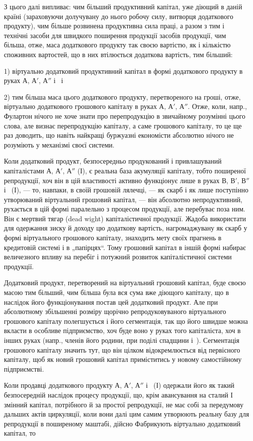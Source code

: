 
З цього далі випливає: чим більший продуктивний капітал, уже
діющий в даній країні (зараховуючи долучувану до нього робочу силу,
витворця додаткового продукту), чим більше розвинена продуктивна сила
праці, а разом з тим і технічні засоби для швидкого поширення продукції
засобів продукції, чим більша, отже, маса додаткового продукту
так своєю вартістю, як і кількістю споживних вартостей, що в них
втілюється додаткова вартість, тим більший:

1) віртуально додатковий продуктивний капітал в формі додаткового
продукту в руках $А$, $А'$, $А''$ і~ і

2) тим більша маса цього додаткового продукту, перетвореного на
гроші, отже, віртуально додаткового грошового капіталу в руках $А$, $А'$, $А''$.
Отже, коли, напр., Фулартон нічого не хоче знати про перепродукцію
в звичайному розумінні цього слова, але визнає перепродукцію капіталу,
а саме грошового капіталу, то це ще раз доводить, що навіть найкращі
буржуазні економісти абсолютно нічого не розуміють у механізмі своєї
системи.

Коли додатковий продукт, безпосередньо продукований і привлашуваний
капіталістами $А$, $А'$, $А''$ (І), є реальна база акумуляції капіталу,
тобто поширеної репродукції, хоч він в цій властивості активно функціонує
лише в руках $В$, $В'$, $В''$ і~ (І), — то, навпаки, в своїй грошовій
лялечці, — як скарб і як лише поступінно утворюваний віртуальний
грошовий капітал, — він абсолютно непродуктивний, рухається
в цій формі паралельно з процесом продукції, але перебуває поза ним.
Він є мертвий тягар (dead wight) капіталістичної продукції. Жадоба використати
для одержання зиску й доходу цю додаткову вартість, нагромаджувану
як скарб у формі віртуального грошового капіталу, знаходить
мету своїх прагнень в кредитовій системі і в „папірцях“. Тому грошовий
капітал в іншій формі набирає величезного впливу на перебіг і потужний
розвиток капіталістичної системи продукції.

Додатковий продукт, перетворений на віртуальний грошовий капітал,
буде своєю масою тим більший, чим більша була вся сума вже діющого
капіталу, що в наслідок його функціонування постав цей додатковий
продукт. Але при абсолютному збільшенні розміру щорічно репродуковуваного
віртуального грошового капіталу полегшується і його сегментація,
так що його швидше можна вкласти в особливе підприємство, хоч буде
воно у руках того капіталіста, хоч в інших руках (напр., членів його родини,
при поділі спадщини і~). Сегментація грошового капіталу значить
тут, що він цілком відокремлюється від первісного капіталу, щоб як
новий грошовий капітал приміститись у новому самостійному підприємстві.

Коли продавці додаткового продукту $А$, $А'$, $А''$ і~ (І) одержали
його як такий безпосередній наслідок процесу продукції, що, крім авансування
на сталий І змінний капітал, потрібного й за простої репродукції,
не має собі за передумову дальших актів циркуляції, коли вони
далі цим самим утворюють реальну базу для репродукції в поширеному
маштабі, дійсно Фабрикують віртуально додатковий капітал, то
\parbreak{}  %

